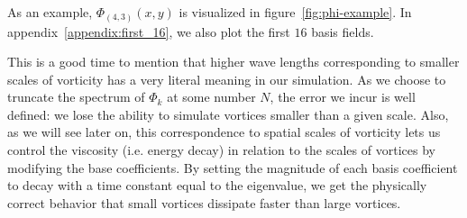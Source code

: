 As an example, $\Phi_{(4,3)}(x,y)$ is visualized in figure~\ref{fig:phi-example}.
In appendix~\ref{appendix:first_16}, we also plot the first $16$ basis fields.

This is a good time to mention that higher wave lengths corresponding to smaller
scales of vorticity has a very literal meaning in our simulation. As we choose
to truncate the spectrum of ${\Phi_k}$ at some number $N$, the error we incur is
well defined: we lose the ability to simulate vortices smaller than a given
scale. Also, as we will see later on, this correspondence to spatial scales of
vorticity lets us control the viscosity (i.e. energy decay) in relation to the
scales of vortices by modifying the base coefficients. By setting the magnitude
of each basis coefficient to decay with a time constant equal to the eigenvalue,
we get the physically correct behavior that small vortices dissipate faster than
large vortices.

